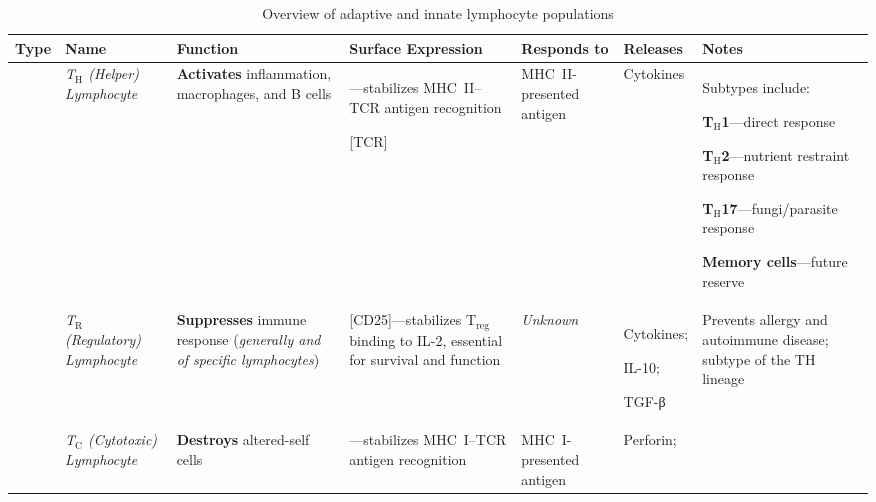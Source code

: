   \begin{table}

    \centering
    \caption{Overview of adaptive and innate lymphocyte populations}
    \label{tab:lymphocytes}
    \begin{tabular}{
      >{\raggedright\arraybackslash}p{1.2cm}
      >{\raggedright\arraybackslash}p{2.2cm}
      >{\raggedright\arraybackslash}p{3.0cm}
      >{\raggedright\arraybackslash}p{3.8cm}
      >{\raggedright\arraybackslash}p{2.5cm}
      >{\raggedright\arraybackslash}p{2.5cm}
      >{\raggedright\arraybackslash}p{3.3cm}
    }
    \hline
    \textbf{Type} & \textbf{Name} & \textbf{Function} & \textbf{Surface Expression} & \textbf{Responds to} & \textbf{Releases} & \textbf{Notes} \\
    \hline

    \multirow{5}{*}{\textbf{ADAPTIVE}}
      & \textit{T$_\text{H}$ (Helper) Lymphocyte} & \textbf{Activates} inflammation, macrophages, and B cells
      & [CD4]---{\footnotesize stabilizes MHC~II--TCR antigen recognition}

      [TCR]
      & MHC~II-presented antigen & Cytokines
      & \footnotesize
        Subtypes include:

        \textbf{T$_\text{H}$1}---direct response

        \textbf{T$_\text{H}$2}---nutrient restraint response

        \textbf{T$_\text{H}$17}---fungi/parasite response

        \textbf{Memory cells}---future reserve \\[4pt]

      & \textit{T$_\text{R}$ (Regulatory) Lymphocyte} & \textbf{Suppresses} immune response (\textit{generally and of specific lymphocytes})
      & [CD4]

      [CD25]---{\footnotesize stabilizes T$_\text{reg}$ binding to IL-2, essential for survival and function}

      & \textit{Unknown}
      & Cytokines;

      IL-10;

      TGF-β
      & \footnotesize Prevents allergy and autoimmune disease; subtype of the TH lineage \\[4pt]

      & \textit{T$_\text{C}$ (Cytotoxic) Lymphocyte} & \textbf{Destroys} altered-self cells
      & [CD8]---{\footnotesize stabilizes MHC~I--TCR antigen recognition}
      & MHC~I-presented antigen
      & Perforin;


\end{tabular}
\end{table}
